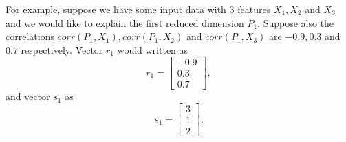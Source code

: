 For example, suppose we have some input data with 3 features $X_1, X_2$ and $X_3$ and we would like to explain the first reduced dimension $P_1$. Suppose also the correlations $corr(P_1, X_1), corr(P_1, X_2)$ and $corr(P_1, X_3)$ are $-0.9, 0.3$ and $0.7$ respectively. Vector $r_1$ would written as
$$
    r_1 =
    \begin{bmatrix}
        -0.9 \\
        0.3  \\
        0.7
    \end{bmatrix},
$$
and vector $s_1$ as
$$
    s_1 =
    \begin{bmatrix}
        3 \\
        1 \\
        2
    \end{bmatrix}.
$$


